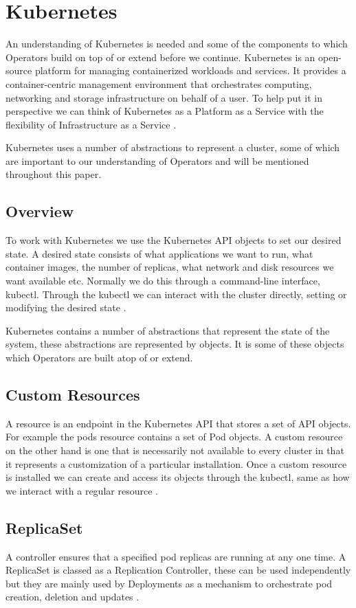 \section{Kubernetes}
\label{sub:kubernetes}
An understanding of Kubernetes is needed and some of the components to which Operators build on top of or extend before we continue. Kubernetes is an open-source platform for managing containerized workloads and services. It provides a container-centric management environment that orchestrates computing, networking and storage infrastructure on behalf of a user. To help put it in perspective we can think of Kubernetes as a Platform as a Service with the flexibility of Infrastructure as a Service \citep{kuberneteswhatis}.

Kubernetes uses a number of abstractions to represent a cluster, some of which are important to our understanding of Operators and will be mentioned throughout this paper.

\subsection{Overview}
To work with Kubernetes we use the Kubernetes API objects to set our desired state. A desired state consists of what applications we want to run, what container images, the number of replicas, what network and disk resources we want available etc. Normally we do this through a command-line interface, kubectl. Through the kubectl we can interact with the cluster directly, setting or modifying the desired state \citep{kuberneteswhatis}. 

Kubernetes contains a number of abstractions that represent the state of the system, these abstractions are represented by objects. It is some of these objects which Operators are built atop of or extend. 

\subsection{Custom Resources}
A resource is an endpoint in the Kubernetes API that stores a set of API objects. For example the pods resource contains a set of Pod objects. A custom resource on the other hand is one that is necessarily not available to every cluster in that it represents a customization of a particular installation. Once a custom resource is installed we can create and access its objects through the kubectl, same as how we interact with a regular resource \citep{customresources}.

\subsection{ReplicaSet}
A controller ensures that a specified pod replicas are running at any one time. A ReplicaSet is classed as a Replication Controller, these can be used independently but they are mainly used by Deployments as a mechanism to orchestrate pod creation, deletion and updates \citep{controllers}.

